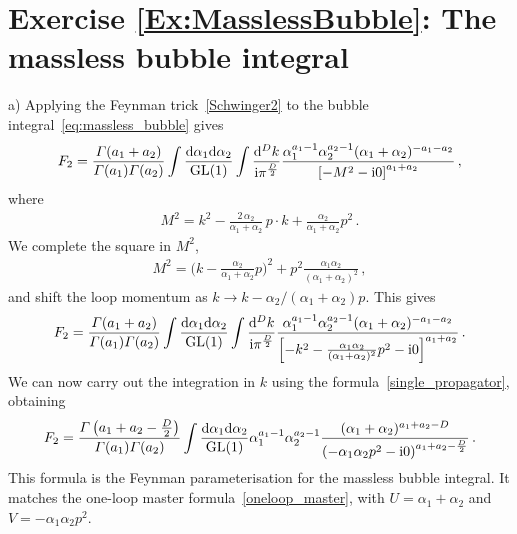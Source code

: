 \section*{Exercise \ref{Ex:MasslessBubble}: The massless bubble integral}
\label{Sol:MasslessBubble}
%
a) Applying the Feynman trick~\eqref{Schwinger2} to the bubble integral~\eqref{eq:massless_bubble} gives
\begin{align}
F_2 = \frac{\Gamma(a_1+a_2)}{\Gamma(a_1) \Gamma(a_2)} \int \frac{\d\alpha_1 \d\alpha_2}{\text{GL}(1)} \int \frac{\d^D k}{\i \pi^{\frac{D}{2}}} \frac{\alpha_1^{a_1-1} \alpha_2^{a_2-1} (\alpha_1+\alpha_2)^{-a_1-a_2}}{ \left[-M^2 - \i 0 \right]^{a_1+a_2}} \,,
\end{align}
where
\begin{align} 
M^2 = k^2 - \frac{2 \, \alpha_2}{\alpha_1+\alpha_2} \, p \cdot k + \frac{\alpha_2}{\alpha_1+\alpha_2} p^2 \,.
\end{align}
We complete the square in $M^2$,
\begin{align}
M^2 = \biggl( k - \frac{\alpha_2}{\alpha_1+\alpha_2} p \biggr)^2 + p^2 \frac{\alpha_1 \alpha_2}{(\alpha_1+\alpha_2)^2} \,,
\end{align}
and shift the loop momentum as $k \to k-\alpha_2/(\alpha_1+\alpha_2) p$. This gives 
\begin{align}
F_2 = \frac{\Gamma(a_1+a_2)}{\Gamma(a_1) \Gamma(a_2)} \int \frac{\d\alpha_1 \d\alpha_2}{\text{GL}(1)} \int \frac{\d^D k}{\i \pi^{\frac{D}{2}}} \frac{\alpha_1^{a_1-1} \alpha_2^{a_2-1} (\alpha_1+\alpha_2)^{-a_1-a_2}}{ \left[-k^2 - \frac{\alpha_1\alpha_2}{(\alpha_1+\alpha_2)^2} p^2 - \i 0 \right]^{a_1+a_2}} \,.
\end{align}
We can now carry out the integration in $k$ using the formula~\eqref{single_propagator}, obtaining
\begin{align} \label{eq:ex4.1_step}
F_2 = \frac{\Gamma\left(a_1+a_2-\frac{D}{2}\right)}{\Gamma(a_1) \Gamma(a_2)} \int \frac{\d\alpha_1 \d\alpha_2}{\text{GL}(1)} \alpha_1^{a_1-1} \alpha_2^{a_2-1} \frac{(\alpha_1+\alpha_2)^{a_1+a_2-D}}{\left( - \alpha_1 \alpha_2 p^2 - \i 0\right)^{a_1+a_2-\frac{D}{2}}} \,.
\end{align}
This formula is the Feynman parameterisation for the massless bubble integral. It matches the one-loop master formula~\eqref{oneloop_master}, with  $U=\alpha_1+\alpha_2$ and $V=-\alpha_1 \alpha_2 p^2$. 

